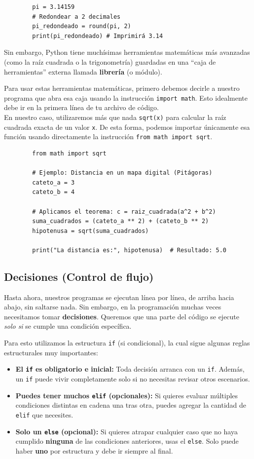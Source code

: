 \documentclass[11pt, a4paper]{article}
\begin{document}
	\begin{lstlisting}
		pi = 3.14159
		# Redondear a 2 decimales
		pi_redondeado = round(pi, 2)
		print(pi_redondeado) # Imprimirá 3.14
	\end{lstlisting}
	
	Sin embargo, Python tiene muchísimas herramientas matemáticas más avanzadas (como la raíz cuadrada o la trigonometría) guardadas en una ``caja de herramientas'' externa llamada \textbf{librería} (o módulo). 
	
	Para usar estas herramientas matemáticas, primero debemos decirle a nuestro programa que abra esa caja usando la instrucción \texttt{import math}. Esto idealmente debe ir en la primera línea de tu archivo de código. \\
	
	En nuestro caso, utilizaremos más que nada \texttt{sqrt(x)} para calcular la raíz cuadrada exacta de un valor \texttt{x}. De esta forma, podemos importar únicamente esa función usando directamente la instrucción \texttt{from math import sqrt}.
	
	\begin{lstlisting}
		from math import sqrt
		
		# Ejemplo: Distancia en un mapa digital (Pitágoras)
		cateto_a = 3
		cateto_b = 4
		
		# Aplicamos el teorema: c = raiz_cuadrada(a^2 + b^2)
		suma_cuadrados = (cateto_a ** 2) + (cateto_b ** 2)
		hipotenusa = sqrt(suma_cuadrados)
		
		print("La distancia es:", hipotenusa)  # Resultado: 5.0
	\end{lstlisting}
	
	\subsection{Decisiones (Control de flujo)}
	Hasta ahora, nuestros programas se ejecutan línea por línea, de arriba hacia abajo, sin saltarse nada. Sin embargo, en la programación muchas veces necesitamos tomar \textbf{decisiones}. Queremos que una parte del código se ejecute \textit{solo si} se cumple una condición específica.
	
	Para esto utilizamos la estructura \texttt{if} (si condicional), la cual sigue algunas reglas estructurales muy importantes:
	\begin{itemize}
		\item \textbf{El \texttt{if} es obligatorio e inicial:} Toda decisión arranca con un \texttt{if}. Además, un \texttt{if} puede vivir completamente solo si no necesitas revisar otros escenarios.
		\item \textbf{Puedes tener muchos \texttt{elif} (opcionales):} Si quieres evaluar múltiples condiciones distintas en cadena una tras otra, puedes agregar la cantidad de \texttt{elif} que necesites.
		\item \textbf{Solo un \texttt{else} (opcional):} Si quieres atrapar cualquier caso que no haya cumplido \textbf{ninguna} de las condiciones anteriores, usas el \texttt{else}. Solo puede haber \textbf{uno} por estructura y debe ir siempre al final.
	\end{itemize}
	
\end{document}
